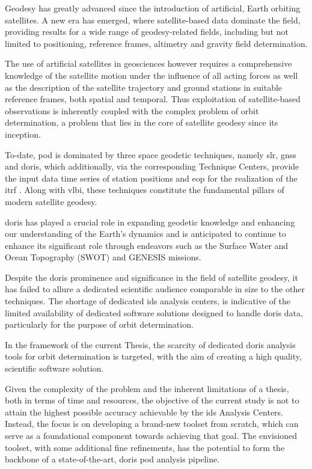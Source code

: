 Geodesy has greatly advanced since the introduction of artificial, Earth orbiting
satellites. A new era has emerged, where satellite-based data dominate the field,
providing results for a wide range of geodesy-related fields, including but not
limited to positioning, reference frames, altimetry and gravity field determination.

The use of artificial satellites in geosciences however requires
a comprehensive knowledge of the satellite motion under
the influence of all acting forces as well as the description of the satellite
trajectory and ground stations in suitable reference frames, both spatial and
temporal. Thus exploitation of satellite-based observations is inherently
coupled with the complex problem of orbit determination, a problem that lies in
the core of satellite geodesy since its inception.

To-date, \gls{pod} is dominated by three space geodetic techniques, namely \gls{slr}, \gls{gnss} and
\gls{doris}, which additionally, via the corresponding Technique Centers, provide the input
data time series of station positions and \gls{eop} for the realization of the \gls{itrf}
. Along with \gls{vlbi}, these
techniques constitute the fundamental pillars of modern satellite geodesy.

\gls{doris} has played a crucial role in expanding geodetic knowledge and enhancing
our understanding of the Earth's dynamics and is anticipated to continue to enhance
its significant role through endeavors such as the Surface Water and Ocean Topography
(SWOT) and GENESIS missions.

Despite the \gls{doris} prominence and significance in the field of satellite geodesy,
it has failed to allure a dedicated scientific audience comparable in size to
the other techniques. The shortage of dedicated \gls{ids} analysis centers,
is indicative of the limited availability of dedicated software solutions designed to
handle \gls{doris} data, particularly for the purpose of orbit determination.

In the framework of the current Thesis, the scarcity of dedicated \gls{doris}
analysis tools for orbit determination is targeted, with the aim of creating
a high quality, scientific software solution.

Given the complexity of the problem and the inherent limitations of a thesis, both in
terms of time and resources, the objective of the current study is not to attain the
highest possible accuracy achievable by the \gls{ids} Analysis Centers. Instead, the
focus is on developing a brand-new toolset from scratch, which can serve as a
foundational component towards achieving that goal. The envisioned toolset, with
some additional fine refinements, has the potential to form the backbone of a
state-of-the-art, \gls{doris} \gls{pod} analysis pipeline.

